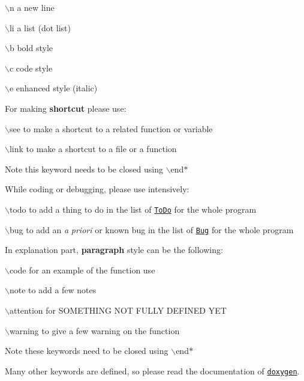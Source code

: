\begin{DoxyItemize}
\item {\ttfamily $\backslash$n} a new line \item {\ttfamily $\backslash$li} a list (dot list)\end{DoxyItemize}
\begin{DoxyItemize}
\item {\ttfamily $\backslash$b} bold style \item {\ttfamily $\backslash$c} code style \item {\ttfamily $\backslash$e} enhanced style (italic)\end{DoxyItemize}
For making {\bfseries shortcut} please use:\par
 \begin{DoxyItemize}
\item {\ttfamily $\backslash$see} to make a shortcut to a related function or variable \item {\ttfamily $\backslash$link} to make a shortcut to a file or a function \begin{DoxyNote}{Note}
this keyword needs to be closed using {\ttfamily $\backslash$end$\ast$} 
\end{DoxyNote}
While coding or debugging, please use intensively: \item {\ttfamily $\backslash$todo} to add a thing to do in the list of \href{todo.html}{\tt ToDo} for the whole program \item {\ttfamily $\backslash$bug} to add an {\itshape a\/} {\itshape priori\/} or known bug in the list of \href{bug.html}{\tt Bug} for the whole program\end{DoxyItemize}
In explanation part, {\bfseries paragraph} style can be the following:\par
 \begin{DoxyItemize}
\item {\ttfamily $\backslash$code} for an example of the function use \item {\ttfamily $\backslash$note} to add a few notes \item {\ttfamily $\backslash$attention} for SOMETHING NOT FULLY DEFINED YET \item {\ttfamily $\backslash$warning} to give a few warning on the function \begin{DoxyNote}{Note}
these keywords need to be closed using {\ttfamily $\backslash$end$\ast$} 
\end{DoxyNote}

\begin{DoxyVerbInclude}
\end{DoxyVerbInclude}
\end{DoxyItemize}
Many other keywords are defined, so please read the documentation of \href{http://www.doxygen.org/commands.html}{\tt doxygen}. 